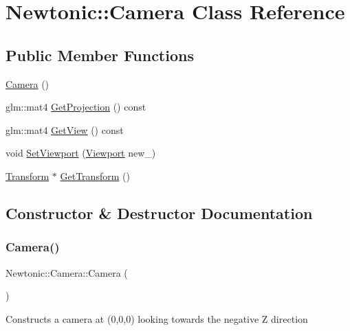 \hypertarget{classNewtonic_1_1Camera}{}\section{Newtonic\+::Camera Class Reference}
\label{classNewtonic_1_1Camera}
\subsection*{Public Member Functions}
\begin{DoxyCompactItemize}
\item 
\mbox{\hyperlink{classNewtonic_1_1Camera_a3a02536eebc5a9b64dbe20e46f76ccea}{Camera}} ()
\item 
glm\+::mat4 \mbox{\hyperlink{classNewtonic_1_1Camera_aca70d30ed6b037969c4b34ca2c7f5c85}{Get\+Projection}} () const
\item 
glm\+::mat4 \mbox{\hyperlink{classNewtonic_1_1Camera_a82dc663bf6a6df7a043c766e35092b93}{Get\+View}} () const
\item 
void \mbox{\hyperlink{classNewtonic_1_1Camera_a52323bc782925980f9ba847643afd9f8}{Set\+Viewport}} (\mbox{\hyperlink{structNewtonic_1_1Viewport}{Viewport}} new\+\_\+)
\item 
\mbox{\hyperlink{classNewtonic_1_1Transform}{Transform}} $\ast$ \mbox{\hyperlink{classNewtonic_1_1Camera_a8cbcc37c9d7a17902efa6061c6cba855}{Get\+Transform}} ()
\end{DoxyCompactItemize}


\subsection{Constructor \& Destructor Documentation}
\mbox{\label{classNewtonic_1_1Camera_a3a02536eebc5a9b64dbe20e46f76ccea}} 
\subsubsection{\texorpdfstring{Camera()}{Camera()}}
{\footnotesize\ttfamily Newtonic\+::\+Camera\+::\+Camera (\begin{DoxyParamCaption}{ }\end{DoxyParamCaption})\hspace{0.3cm}{\ttfamily [inline]}}

Constructs a camera at (0,0,0) looking towards the negative Z direction 

